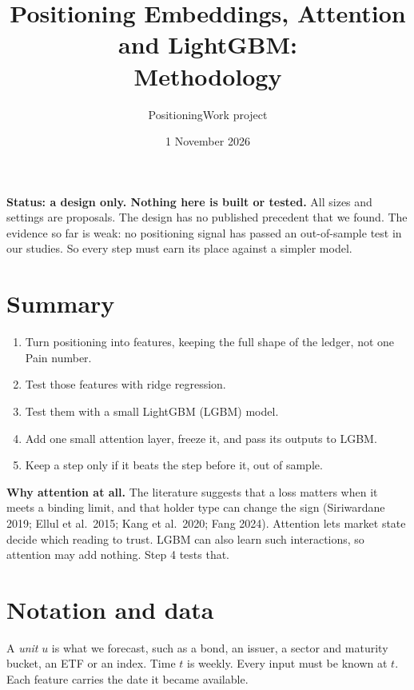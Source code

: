 \documentclass[11pt]{article}
\title{Positioning Embeddings, Attention and LightGBM:\\ Methodology}
\author{PositioningWork project}
\date{1 November 2026}
\begin{document}
\maketitle

\textbf{Status: a design only. Nothing here is built or tested.} All sizes and settings are proposals. The design has no published precedent that we found. The evidence so far is weak: no positioning signal has passed an out-of-sample test in our studies. So every step must earn its place against a simpler model.

\section*{Summary}
\begin{enumerate}
\item Turn positioning into features, keeping the full shape of the ledger, not one Pain number.
\item Test those features with ridge regression.
\item Test them with a small LightGBM (LGBM) model.
\item Add one small attention layer, freeze it, and pass its outputs to LGBM.
\item Keep a step only if it beats the step before it, out of sample.
\end{enumerate}

\textbf{Why attention at all.} The literature suggests that a loss matters when it meets a binding limit, and that holder type can change the sign (Siriwardane 2019; Ellul et al.\ 2015; Kang et al.\ 2020; Fang 2024). Attention lets market state decide which reading to trust. LGBM can also learn such interactions, so attention may add nothing. Step 4 tests that.

\section{Notation and data}
A \emph{unit} $u$ is what we forecast, such as a bond, an issuer, a sector and maturity bucket, an ETF or an index. Time $t$ is weekly. Every input must be known at $t$. Each feature carries the date it became available.
\end{document}
